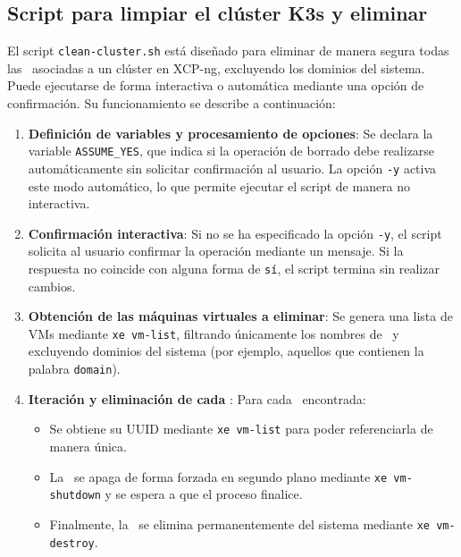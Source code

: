 \subsection{Script para limpiar el clúster K3s y eliminar \VM}
\noindent
El script \texttt{clean-cluster.sh} está diseñado para eliminar de manera segura todas las \VM\ asociadas a un clúster en XCP-ng, excluyendo los dominios del sistema. Puede ejecutarse de forma interactiva o automática mediante una opción de confirmación. Su funcionamiento se describe a continuación:

\begin{enumerate}
    \item \textbf{Definición de variables y procesamiento de opciones}:  
    Se declara la variable \texttt{ASSUME\_YES}, que indica si la operación de borrado debe realizarse automáticamente sin solicitar confirmación al usuario.  
    La opción \texttt{-y} activa este modo automático, lo que permite ejecutar el script de manera no interactiva.

    \item \textbf{Confirmación interactiva}:  
    Si no se ha especificado la opción \texttt{-y}, el script solicita al usuario confirmar la operación mediante un mensaje. Si la respuesta no coincide con alguna forma de \texttt{sí}, el script termina sin realizar cambios.

    \item \textbf{Obtención de las máquinas virtuales a eliminar}:  
    Se genera una lista de VMs mediante \texttt{xe vm-list}, filtrando únicamente los nombres de \VM\ y excluyendo dominios del sistema (por ejemplo, aquellos que contienen la palabra \texttt{domain}).  

    \item \textbf{Iteración y eliminación de cada \VM}:  
    Para cada \VM\ encontrada:
    \begin{itemize}
        \item Se obtiene su UUID mediante \texttt{xe vm-list} para poder referenciarla de manera única.
        \item La \VM\ se apaga de forma forzada en segundo plano mediante \texttt{xe vm-shutdown} y se espera a que el proceso finalice.
        \item Finalmente, la \VM\ se elimina permanentemente del sistema mediante \texttt{xe vm-destroy}.
    \end{itemize}
\end{enumerate}


